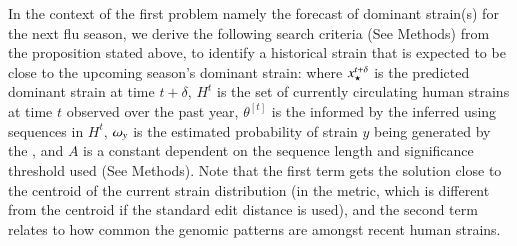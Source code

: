 \documentclass[onecolumn, compsoc,10pt]{IEEEtran}
\begin{document}
In the context of the first problem namely the  forecast of dominant strain(s) for the next flu season,  we derive the following search criteria (See Methods) from the proposition stated above, to identify a historical strain that is expected to be close to the upcoming season's dominant strain:
%
%
where $x_\star^{t+\delta}$ is the predicted dominant strain  at time $t+\delta$, $H^t$ is the set of currently circulating human strains at time $t$  observed over the past year, $\theta^{[t]}$ is the \qdist informed by the inferred \enet using sequences in $H^t$, $\omega_{y}$ is the estimated probability of strain $y$ being generated by the \enet, and $A$ is a constant dependent on the sequence length and significance threshold used (See Methods). Note that the first term gets the solution close to the centroid of the current strain distribution (in the \qdist metric, which is different from the centroid if the standard edit distance is used), and the second term relates to how common the genomic patterns are amongst recent human strains. 
\end{document}
